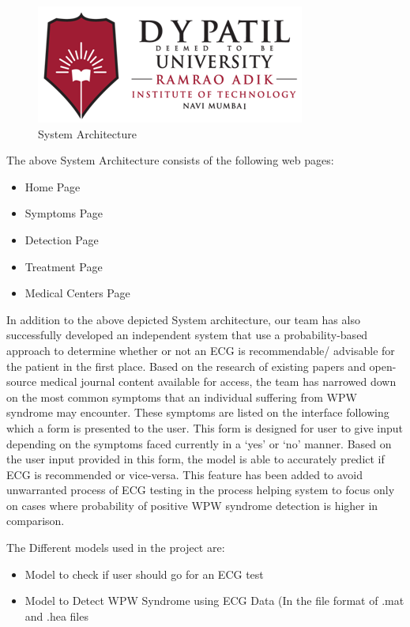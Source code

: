 \begin{figure}[h]
	\centering
	\includegraphics{rait-dypu-logo.png}
	\caption{System Architecture}
	\label{fig:system-architecture}
\end{figure}
The above System Architecture consists of the following web pages:  
\begin{itemize}
	\item Home Page  
	\item Symptoms Page 
	\item Detection Page 
	\item Treatment Page 
	\item Medical Centers Page  
\end{itemize}
In addition to the above depicted System architecture, our team has also successfully developed an independent system that use a probability-based approach to determine whether or not an ECG is recommendable/ advisable for the patient in the first place. Based on the research of existing papers and open-source medical journal content available for access, the team has narrowed down on the most common symptoms that an individual suffering from WPW syndrome may encounter. These symptoms are listed on the interface following which a form is presented to the user. This form is designed for user to give input depending on the symptoms faced currently in a ‘yes’ or ‘no’ manner. Based on the user input provided in this form, the model is able to accurately predict if ECG is recommended or vice-versa. This feature has been added to avoid unwarranted process of ECG testing in the process helping system to focus only on cases where probability of positive WPW syndrome detection is higher in comparison. 

The Different models used in the project are:  
\begin{itemize}
	\item Model to check if user should go for an ECG test 
	\item Model to Detect WPW Syndrome using ECG Data (In the file format of .mat and .hea files 
\end{itemize}

